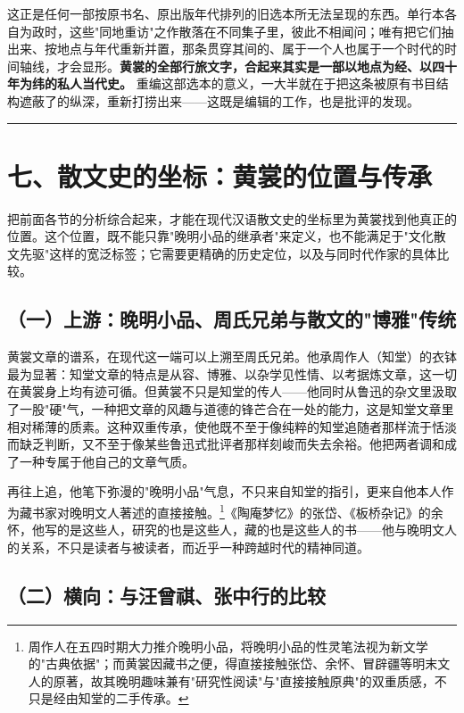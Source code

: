 \documentclass[UTF8,fontset=none,zihao=-4,a4paper]{ctexart}
\begin{document}
这正是任何一部按原书名、原出版年代排列的旧选本所无法呈现的东西。单行本各自为政时，这些"同地重访"之作散落在不同集子里，彼此不相闻问；唯有把它们抽出来、按地点与年代重新并置，那条贯穿其间的、属于一个人也属于一个时代的时间轴线，才会显形。\textbf{黄裳的全部行旅文字，合起来其实是一部以地点为经、以四十年为纬的私人当代史。} 重编这部选本的意义，一大半就在于把这条被原有书目结构遮蔽了的纵深，重新打捞出来——这既是编辑的工作，也是批评的发现。


\medskip\hrule\medskip

\section{七、散文史的坐标：黄裳的位置与传承}


把前面各节的分析综合起来，才能在现代汉语散文史的坐标里为黄裳找到他真正的位置。这个位置，既不能只靠"晚明小品的继承者"来定义，也不能满足于"文化散文先驱"这样的宽泛标签；它需要更精确的历史定位，以及与同时代作家的具体比较。


\subsection{（一）上游：晚明小品、周氏兄弟与散文的"博雅"传统}


黄裳文章的谱系，在现代这一端可以上溯至周氏兄弟。他承周作人（知堂）的衣钵最为显著：知堂文章的特点是从容、博雅、以杂学见性情、以考据炼文章，这一切在黄裳身上均有迹可循。但黄裳不只是知堂的传人——他同时从鲁迅的杂文里汲取了一股"硬"气，一种把文章的风趣与道德的锋芒合在一处的能力，这是知堂文章里相对稀薄的质素。这种双重传承，使他既不至于像纯粹的知堂追随者那样流于恬淡而缺乏判断，又不至于像某些鲁迅式批评者那样刻峻而失去余裕。他把两者调和成了一种专属于他自己的文章气质。


再往上追，他笔下弥漫的"晚明小品"气息，不只来自知堂的指引，更来自他本人作为藏书家对晚明文人著述的直接接触。\footnote{周作人在五四时期大力推介晚明小品，将晚明小品的性灵笔法视为新文学的"古典依据"；而黄裳因藏书之便，得直接接触张岱、余怀、冒辟疆等明末文人的原著，故其晚明趣味兼有"研究性阅读"与"直接接触原典"的双重质感，不只是经由知堂的二手传承。}《陶庵梦忆》的张岱、《板桥杂记》的余怀，他写的是这些人，研究的也是这些人，藏的也是这些人的书——他与晚明文人的关系，不只是读者与被读者，而近乎一种跨越时代的精神同道。


\subsection{（二）横向：与汪曾祺、张中行的比较}
\end{document}
